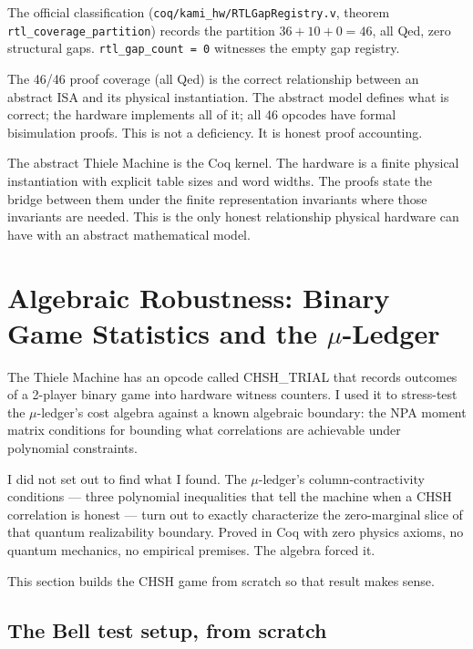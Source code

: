 \documentclass[11pt,a4paper]{article}
\theoremstyle{plain}
\theoremstyle{definition}
\theoremstyle{remark}
\begin{document}
The official classification (\texttt{coq/kami\_hw/RTLGapRegistry.v}, theorem \texttt{rtl\_coverage\_partition}) records the partition $36 + 10 + 0 = 46$, all Qed, zero structural gaps. \texttt{rtl\_gap\_count = 0} witnesses the empty gap registry.

The 46/46 proof coverage (all Qed) is the correct relationship between an abstract ISA and its physical instantiation. The abstract model defines what is correct; the hardware implements all of it; all 46 opcodes have formal bisimulation proofs. This is not a deficiency. It is honest proof accounting.

The abstract Thiele Machine is the Coq kernel. The hardware is a finite physical instantiation with explicit table sizes and word widths. The proofs state the bridge between them under the finite representation invariants where those invariants are needed. This is the only honest relationship physical hardware can have with an abstract mathematical model.

\section{Algebraic Robustness: Binary Game Statistics and the \texorpdfstring{$\mu$}{mu}-Ledger}
\label{sec:chsh}

The Thiele Machine has an opcode called CHSH\_TRIAL that records outcomes of a 2-player binary game into hardware witness counters. I used it to stress-test the $\mu$-ledger's cost algebra against a known algebraic boundary: the NPA moment matrix conditions for bounding what correlations are achievable under polynomial constraints.

I did not set out to find what I found. The $\mu$-ledger's column-contractivity conditions --- three polynomial inequalities that tell the machine when a CHSH correlation is honest --- turn out to exactly characterize the zero-marginal slice of that quantum realizability boundary. Proved in Coq with zero physics axioms, no quantum mechanics, no empirical premises. The algebra forced it.

This section builds the CHSH game from scratch so that result makes sense.

\subsection{The Bell test setup, from scratch}
\end{document}
